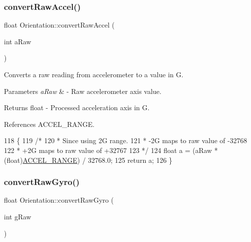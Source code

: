 \subsubsection{\texorpdfstring{convert\+Raw\+Accel()}{convertRawAccel()}}
{\footnotesize\ttfamily float Orientation\+::convert\+Raw\+Accel (\begin{DoxyParamCaption}\item[{int}]{a\+Raw }\end{DoxyParamCaption})\hspace{0.3cm}{\ttfamily [private]}}



Converts a raw reading from accelerometer to a value in G. 


\begin{DoxyParams}{Parameters}
{\em a\+Raw} & -\/ Raw accelerometer axis value. \\
\hline
\end{DoxyParams}
\begin{DoxyReturn}{Returns}
float -\/ Processed acceleration axis in G. 
\end{DoxyReturn}


References A\+C\+C\+E\+L\+\_\+\+R\+A\+N\+GE.


\begin{DoxyCode}
118 \{
119   \textcolor{comment}{/*}
120 \textcolor{comment}{   * Since using 2G range.}
121 \textcolor{comment}{   * -2G maps to raw value of -32768}
122 \textcolor{comment}{   * +2G maps to raw value of +32767}
123 \textcolor{comment}{   */}
124    \textcolor{keywordtype}{float} a = (aRaw * (float)\hyperlink{_orientation_8cpp_a16ec7011dea5773b504e875852f35fc1}{ACCEL\_RANGE}) / 32768.0;
125    \textcolor{keywordflow}{return} a;
126 \}
\end{DoxyCode}
\mbox{\label{class_logging_device_1_1_orientation_a99bb5ed3c3226c5d636fa48f26f491dd}} 
\subsubsection{\texorpdfstring{convert\+Raw\+Gyro()}{convertRawGyro()}}
{\footnotesize\ttfamily float Orientation\+::convert\+Raw\+Gyro (\begin{DoxyParamCaption}\item[{int}]{g\+Raw }\end{DoxyParamCaption})\hspace{0.3cm}{\ttfamily [private]}}



